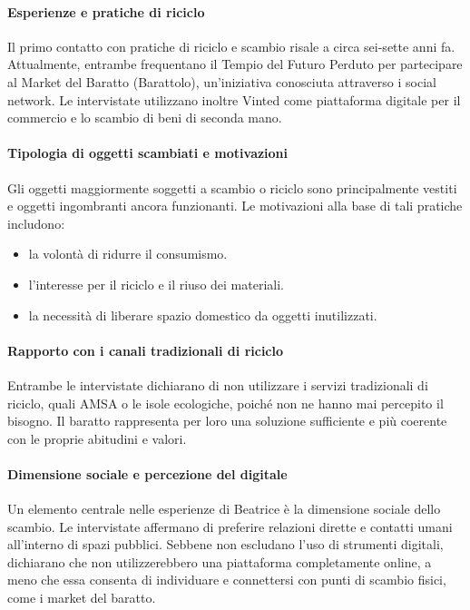 \documentclass[12pt,a4paper]{article}
\begin{document}
\paragraph{Esperienze e pratiche di riciclo}


Il primo contatto con pratiche di riciclo e scambio risale a circa sei-sette anni fa. Attualmente, entrambe frequentano il Tempio del Futuro Perduto per partecipare al Market del Baratto (Barattolo), un’iniziativa conosciuta attraverso i social network.
Le intervistate utilizzano inoltre Vinted come piattaforma digitale per il commercio e lo scambio di beni di seconda mano.

\paragraph{Tipologia di oggetti scambiati e motivazioni}

Gli oggetti maggiormente soggetti a scambio o riciclo sono principalmente vestiti e oggetti ingombranti ancora funzionanti. Le motivazioni alla base di tali pratiche includono:

\begin{itemize}
  \item la volontà di ridurre il consumismo.
  \item l’interesse per il riciclo e il riuso dei materiali.
  \item la necessità di liberare spazio domestico da oggetti inutilizzati.
\end{itemize}

\paragraph{Rapporto con i canali tradizionali di riciclo}

Entrambe le intervistate dichiarano di non utilizzare i servizi tradizionali di riciclo, quali AMSA o le isole ecologiche, poiché non ne hanno mai percepito il bisogno. Il baratto rappresenta per loro una soluzione sufficiente e più coerente con le proprie abitudini e valori.

\paragraph{Dimensione sociale e percezione del digitale}

Un elemento centrale nelle esperienze di Beatrice è la dimensione sociale dello scambio. Le intervistate affermano di preferire relazioni dirette e contatti umani all’interno di spazi pubblici.
Sebbene non escludano l’uso di strumenti digitali, dichiarano che non utilizzerebbero una piattaforma completamente online, a meno che essa consenta di individuare e connettersi con punti di scambio fisici, come i market del baratto.
\end{document}
